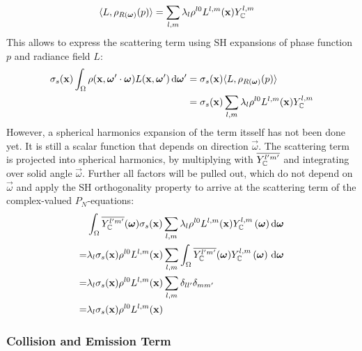 \begin{align*}
\langle L,  \rho_{R(\boldsymbol{\mathbf{\omega}})}(p)\rangle
&=
\sum_{l,m}
{
\lambda_l
\rho^{l0}L^{l,m}(\boldsymbol{\mathbf{x}})
Y_{\mathbb{C}}^{l,m}
}
\end{align*}
This allows to express the scattering term using SH expansions of phase function $p$ and radiance field $L$:
\begin{align*}
\sigma_s(\boldsymbol{\mathbf{x}})\int_{\Omega}\rho(\boldsymbol{\mathbf{x}}, \boldsymbol{\mathbf{\omega}}'\cdot\boldsymbol{\mathbf{\omega}})L(\boldsymbol{\mathbf{x}}, \boldsymbol{\mathbf{\omega}}')\,\mathrm{d}\boldsymbol{\mathbf{\omega}}'
&=
\sigma_s(\boldsymbol{\mathbf{x}})\langle L,  \rho_{R(\boldsymbol{\mathbf{\omega}})}(p)\rangle
\\
&=
\sigma_s(\boldsymbol{\mathbf{x}})
\sum_{l,m}
{
\lambda_l
\rho^{l0}L^{l,m}(\boldsymbol{\mathbf{x}})
Y_{\mathbb{C}}^{l,m}
}
\end{align*}
However, a spherical harmonics expansion of the term itsself has not been done yet. It is still a scalar function that depends on direction $\vec{\omega}$. The scattering term is projected into spherical harmonics, by multiplying with $\overline {Y_{\mathbb{C}}^{l'm'}}$ and integrating over solid angle $\vec{\omega}$. Further all factors will be pulled out, which do not depend on $\vec{\omega}$ and apply the SH orthogonality property to arrive at the scattering term of the complex-valued $P_N$-equations:
\begin{align}
&
\int_{\Omega}
{
\overline{Y_{\mathbb{C}}^{l'm'}}(\boldsymbol{\mathbf{\omega}})
\sigma_s(\boldsymbol{\mathbf{x}})
\sum_{l,m}
{
\lambda_l
\rho^{l0}L^{l,m}(\boldsymbol{\mathbf{x}})
Y_{\mathbb{C}}^{l,m}\left(\boldsymbol{\mathbf{\omega}}\right)
}
\,\mathrm{d}\boldsymbol{\mathbf{\omega}}
}
\nonumber\\
=&
\lambda_l
\sigma_s(\boldsymbol{\mathbf{x}})
\rho^{l0}L^{l,m}(\boldsymbol{\mathbf{x}})
\sum_{l,m}
{
\int_{\Omega}
{
\overline{Y_{\mathbb{C}}^{l'm'}}(\boldsymbol{\mathbf{\omega}})
Y_{\mathbb{C}}^{l,m}\left(\boldsymbol{\mathbf{\omega}}\right)
\,\mathrm{d}\boldsymbol{\mathbf{\omega}}
}
}
\nonumber\\
=&
\lambda_l
\sigma_s(\boldsymbol{\mathbf{x}})
\rho^{l0}L^{l,m}(\boldsymbol{\mathbf{x}})
\sum_{l,m}
{
\delta_{ll'}\delta_{mm'}
}
\nonumber\\
=&
\lambda_l
\sigma_s(\boldsymbol{\mathbf{x}})
\rho^{l0}L^{l,m}(\boldsymbol{\mathbf{x}})
\label{eq:sh_complex_scattering}
\end{align}



\subsubsection*{Collision and Emission Term}

